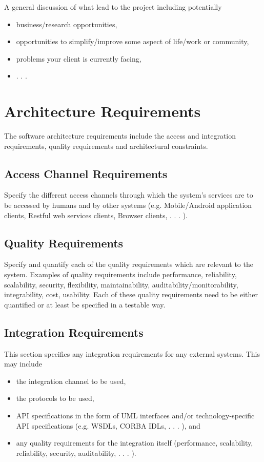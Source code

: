 \documentclass[a4paper,12pt]{article}
\begin{document}
A general discussion of what lead to the project including potentially
\begin{itemize}
\item business/research opportunities,
\item opportunities to simplify/improve some aspect of life/work or community,
\item problems your client is currently facing,
\item . . .
\end{itemize}

\section{Architecture Requirements}

The software architecture requirements include the access and integration requirements, quality
requirements and architectural constraints.

\subsection{Access Channel Requirements}

Specify the different access channels through which the system's services are to be accessed by
humans and by other systems (e.g. Mobile/Android application clients, Restful web services
clients, Browser clients, . . . ).

\subsection{Quality Requirements}

Specify and quantify each of the quality requirements which are relevant to the system. Examples of quality requirements include performance, reliability, scalability, security, 
flexibility,
maintainability, auditability/monitorability, integrability, cost, usability. Each of these quality
requirements need to be either quantified or at least be specified in a testable way.

\subsection{Integration Requirements}

This section specifies any integration requirements for any external systems. This may include
\begin{itemize}
\item the integration channel to be used,
\item the protocols to be used,
\item API specifications in the form of UML interfaces and/or technology-specific API specifications (e.g. WSDLs, CORBA IDLs, . . . ), and
\item any quality requirements for the integration itself (performance, scalability, reliability, security, auditability, . . . ).
\end{itemize}
\end{document}
